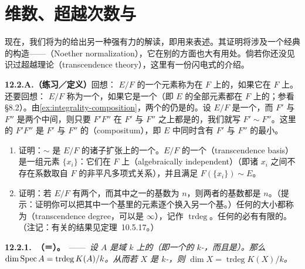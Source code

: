 
\section{维数、超越次数与\trNoetherNormalization}

现在，我们将为\trIrreducible\trVariety{}的\trDimension{}给出另一种强有力的解读，即用\trTrDeg{}来表述。其证明将涉及一个经典的构造——\trNoetherNormalization（Noether normalization），它在别的方面也大有用处。倘若你还没见识过超越理论（transcendence theory），这里有一份闪电式的介绍。

\textbf{12.2.A.（练习／定义）}\quad 回想：\trFieldExtension{} $E/F$ 的一个元素称为在 $F$ 上\trAlgebraic{}的，如果它在 $F$ 上\trIntegral。还要回想：\trFieldExtension{} $E/F$ 称为一个\trAlgebraic\trFieldExtension，如果它是一个\trIntegralExtension{}（即 $E$ 的全部元素都在 $F$ 上\trAlgebraic{}的；参看 \S8.2）。由\cref{ex:integrality-composition}，两个\trAlgebraic\trFieldExtension{}的\trComposition{}仍是\trAlgebraic{}的。设 $E/F$ 是一个\trFieldExtension，而 $F'$ 与 $F''$ 是两个中间\trFieldExtension，则只要 $F'F''$ 在 $F'$ 与 $F''$ 之上都是\trAlgebraic{}的，我们就写 $F'\sim F''$。这里的 $F'F''$ 是 $F'$ 与 $F''$ 的\textbf{\trCompositum}（compositum），即 $E$ 中同时含有 $F'$ 与 $F''$ 的最小\trFieldExtension。
\begin{enumerate}[label=(\alph*)]
  \item 证明：$\sim$ 是 $E/F$ 的诸子扩张上的一个\trEquivalenceRelation。$E/F$ 的一个\textbf{\trTranscendenceBase}（transcendence basis）是一组元素 $\{x_i\}$：它们在 $F$ 上\textbf{\trAlgebraicallyIndependent}（algebraically independent）（即诸 $x_i$ 之间不存在系数取自 $F$ 的非平凡多项式关系），并且满足 $F(\{x_i\})\sim E$。
  \item 证明：若 $E/F$ 有两个\trTranscendenceBase，而其中之一的基数为 $n$，则两者的基数都是 $n$。（提示：证明你可以把其中一个基里的元素逐个换入另一个基。）任何\trTranscendenceBase{}的大小都称为\textbf{\trTrDeg}（transcendence degree，可以是 $\infty$），记作 $\operatorname{trdeg}$。任何\trFinitelyGenerated{}的\trFieldExtension{}必有有限的\trTrDeg。（注记：有关的结果见定理~10.5.17。）
\end{enumerate}

\textbf{12.2.1.\ \trhTheorem{}（\trDimension{}＝\trTrDeg）。}\ ——\ \emph{设 $A$ 是域 $k$ 上\trFinitelyGenerated{}的\trIntegralDomain{}（即一个\trFinitelyGenerated{}的 $k$-\trAlgebra，而且是\trIntegralDomain）。那么 $\dim\operatorname{Spec} A=\operatorname{trdeg}K(A)/k$。从而若 $X$ 是\trIrreducible{} $k$-\trVariety，则 $\dim X=\operatorname{trdeg}K(X)/k$。}

